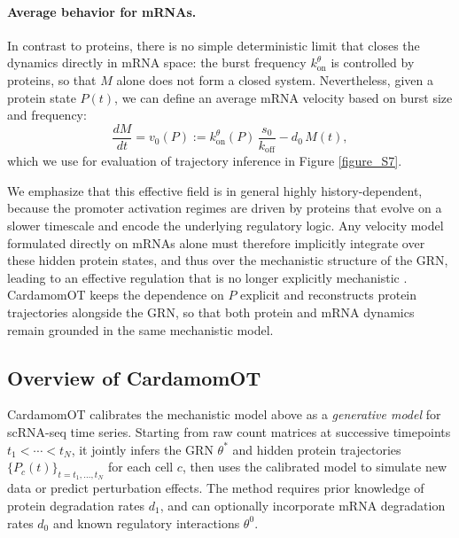 \documentclass[a4paper, 11pt]{article}
\theoremstyle{plain}
\theoremstyle{remark}
\begin{document}
\paragraph{Average behavior for mRNAs.}
In contrast to proteins, there is no simple deterministic limit that closes the dynamics directly in mRNA space: the burst frequency $k^{\theta}_{\mathrm{on}}$ is controlled by proteins, so that $M$ alone does not form a closed system. Nevertheless, given a protein state \(P(t)\), we can define an average mRNA velocity based on burst size and frequency:
\begin{equation}
\label{eq:velocity_rna}
\frac{dM}{dt}
= v_0(P)
:= k^{\theta}_{\mathrm{on}}(P)\,\frac{s_0}{k_{\mathrm{off}}}
- d_0\,M(t),
\end{equation}
which we use for evaluation of trajectory inference in Figure \ref{figure_S7}.

We emphasize that this effective field is in general highly history-dependent, because the promoter activation regimes are driven by proteins that evolve on a slower timescale and encode the underlying regulatory logic. Any velocity model formulated directly on mRNAs alone must therefore implicitly integrate over these hidden protein states, and thus over the mechanistic structure of the GRN, leading to an effective regulation that is no longer explicitly mechanistic \cite{bertin2025scalable}. CardamomOT keeps the dependence on $P$ explicit and reconstructs protein trajectories alongside the GRN, so that both protein and mRNA dynamics remain grounded in the same mechanistic model.


\subsection{Overview of CardamomOT}
\label{subsec:overview}

CardamomOT calibrates the mechanistic model above as a \emph{generative model} for scRNA-seq time series. Starting from raw count matrices at successive timepoints $t_1 < \cdots < t_N$, it jointly infers the GRN $\theta^*$ and hidden protein trajectories $\{P_c(t)\}_{t=t_1,\dots,t_N}$ for each cell $c$, then uses the calibrated model to simulate new data or predict perturbation effects. The method requires prior knowledge of protein degradation rates $d_1$, and can optionally incorporate mRNA degradation rates $d_0$ and known regulatory interactions $\theta^0$.
\end{document}
